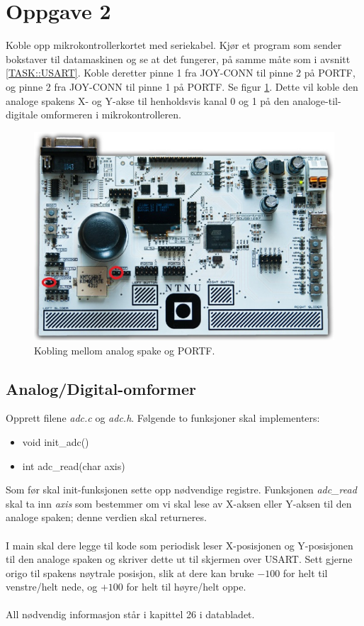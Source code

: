 \documentclass[11pt,a4paper]{article}
\begin{document}
\section{Oppgave 2}
Koble opp mikrokontrollerkortet med seriekabel. Kjør et program som sender bokstaver til datamaskinen og se at det fungerer, på samme måte som i avsnitt \ref{TASK::USART}. Koble deretter pinne 1 fra JOY-CONN til pinne 2 på PORTF, og pinne 2 fra JOY-CONN til pinne 1 på PORTF. Se figur \ref{JOY::PORTF}. Dette vil koble den analoge spakens X- og Y-akse til henholdsvis kanal 0 og 1 på den analoge-til-digitale omformeren i mikrokontrolleren.
\begin{figure}
\centering
\includegraphics[width=0.8\linewidth]{joystick_portf.png}
\caption{Kobling mellom analog spake og PORTF.}
\label{JOY::PORTF}
\end{figure}
\subsection{Analog/Digital-omformer}
Opprett filene \textit{adc.c} og \textit{adc.h}. Følgende to funksjoner skal implementers:
\begin{itemize}
\item void init\_adc()
\item int adc\_read(char axis)
\end{itemize}
Som før skal init-funksjonen sette opp nødvendige registre. Funksjonen \textit{adc\_read} skal ta inn \textit{axis} som bestemmer om vi skal lese av X-aksen eller Y-aksen til den analoge spaken; denne verdien skal returneres.\\
\\
I main skal dere legge til kode som periodisk leser X-posisjonen og Y-posisjonen til den analoge spaken og skriver dette ut til skjermen over USART. Sett gjerne origo til spakens nøytrale posisjon, slik at dere kan bruke $-100$ for helt til venstre/helt nede, og $+100$ for helt til høyre/helt oppe.\\
\\
All nødvendig informasjon står i kapittel 26 i databladet.
\end{document}
